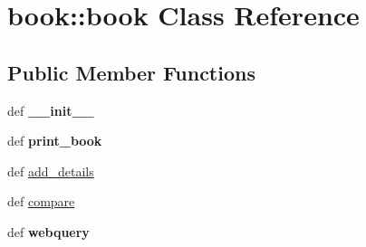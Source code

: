 \hypertarget{classbook_1_1book}{
\section{book::book Class Reference}
\label{classbook_1_1book}
}
\subsection*{Public Member Functions}
\begin{DoxyCompactItemize}
\item 
\hypertarget{classbook_1_1book_a01b7bc300f7a18aea7036fffd3f02736}{
def {\bfseries \_\-\_\-init\_\-\_\-}}
\label{classbook_1_1book_a01b7bc300f7a18aea7036fffd3f02736}

\item 
\hypertarget{classbook_1_1book_a015476bb498fdf9c2287fbfc3b4a955c}{
def {\bfseries print\_\-book}}
\label{classbook_1_1book_a015476bb498fdf9c2287fbfc3b4a955c}

\item 
def \hyperlink{classbook_1_1book_ac8ad8a373612f3b1ab7d47fb3b1b0995}{add\_\-details}
\item 
def \hyperlink{classbook_1_1book_a3d5a58243105ee5a8477a90a89c78b80}{compare}
\item 
\hypertarget{classbook_1_1book_a31375753e289f44942fbe454c6a076fd}{
def {\bfseries webquery}}
\label{classbook_1_1book_a31375753e289f44942fbe454c6a076fd}

\end{DoxyCompactItemize}
